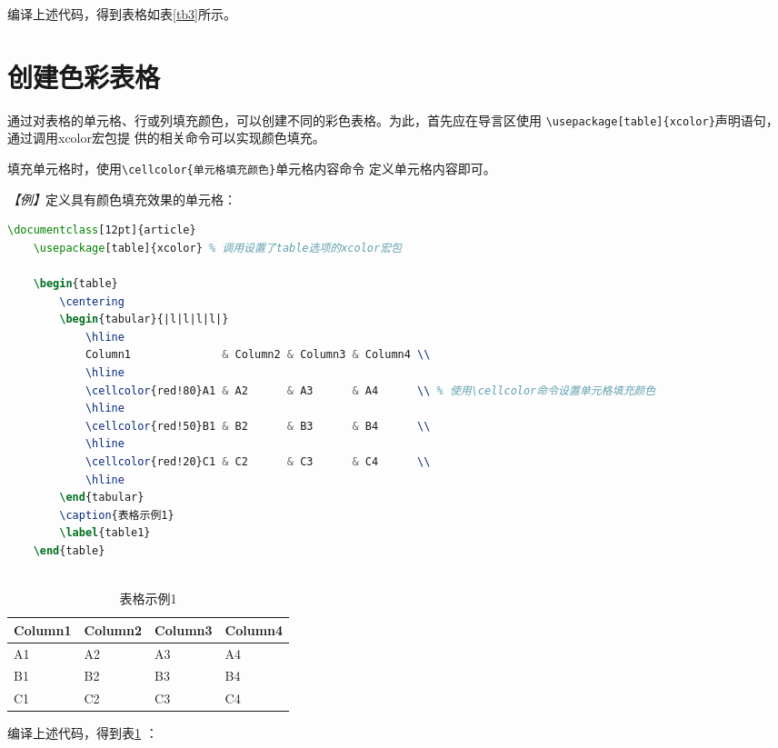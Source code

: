 编译上述代码，得到表格如表\ref{tb3}所示。

\section{创建色彩表格}
通过对表格的单元格、行或列填充颜色，可以创建不同的彩色表格。为此，首先应在导言区使用
\texttt{\textbackslash{}usepackage[table]\{xcolor\}}声明语句，通过调用xcolor宏包提
供的相关命令可以实现颜色填充。

填充单元格时，使用\texttt{\textbackslash{}cellcolor\{单元格填充颜色\}}单元格内容命令
定义单元格内容即可。

\emph{【例】}定义具有颜色填充效果的单元格：
\begin{lstlisting}[language=TeX]
    \documentclass[12pt]{article}
    \usepackage[table]{xcolor} % 调用设置了table选项的xcolor宏包
    
    \begin{table}
        \centering
        \begin{tabular}{|l|l|l|l|}
            \hline
            Column1              & Column2 & Column3 & Column4 \\
            \hline
            \cellcolor{red!80}A1 & A2      & A3      & A4      \\ % 使用\cellcolor命令设置单元格填充颜色
            \hline
            \cellcolor{red!50}B1 & B2      & B3      & B4      \\
            \hline
            \cellcolor{red!20}C1 & C2      & C3      & C4      \\
            \hline
        \end{tabular}
        \caption{表格示例1}
        \label{table1}
    \end{table}
    
\end{lstlisting}

\begin{table}
    \centering
    \begin{tabular}{|l|l|l|l|}
        \hline
        Column1              & Column2 & Column3 & Column4 \\
        \hline
        \cellcolor{red!80}A1 & A2      & A3      & A4      \\ %
        \hline
        \cellcolor{red!50}B1 & B2      & B3      & B4      \\
        \hline
        \cellcolor{red!20}C1 & C2      & C3      & C4      \\
        \hline
    \end{tabular}
    \caption{表格示例1}
    \label{table1}
\end{table}
编译上述代码，得到表\ref{table1} ：

